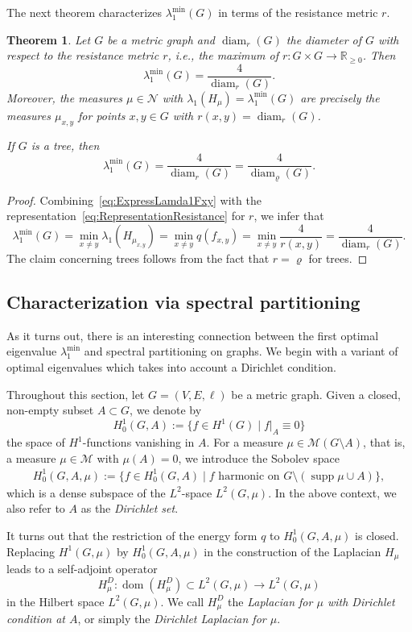 \documentclass[reqno]{amsart}
\theoremstyle{plain}
\newtheorem{thm}{Theorem}[section]
\theoremstyle{definition}
\theoremstyle{remark}
\numberwithin{equation}{section}
\newcommand{\R}{\mathbb{R}}     %
\newcommand{\cM}{\mathcal{M}}
\newcommand{\cN}{\mathcal{N}}
\newcommand{\supp}{\operatorname{supp}}
\newcommand{\dom}{\operatorname{dom}}
\newcommand{\diam}{\operatorname{diam}}
\begin{document}
The next theorem characterizes $\lambda_1^{\min}(G)$ in terms of the resistance metric $r$.
\begin{thm} \label{Lem: Resitance metric and optimal eigenvalue}
	Let $G$ be a metric graph and $\diam_r(G)$ the diameter of $G$ with respect to the resistance metric $r$, i.e., the maximum of $r\colon G \times G \to \R_{\geq 0}$. Then
	\[
	\lambda_1^{\min}(G) = \frac{4}{\diam_r(G)}.
	\]
	Moreover, the measures $\mu \in \cN$ with $\lambda_1(H_\mu) = \lambda_1^{\min}(G)$ are precisely the measures $\mu_{x,y}$ for points $x, y\in G$ with $r(x,y) = \diam_r(G)$.
	
	If $G$ is a tree, then
	\[
	\lambda_1^{\min}(G) = \frac{4}{\diam_r(G)} = \frac{4}{\diam_\varrho(G)}.
	\]
\end{thm}
\begin{proof}
	Combining~\eqref{eq:ExpressLamda1Fxy} with the representation~\eqref{eq:RepresentationResistance} for $r$, we infer that
	\[
	\lambda_1^{\min}(G)  = \min_{x \neq y} \lambda_1 (H_{\mu_{x,y}}) =\min_{x \neq y} q(f_{x,y}) =  \min_{x \neq y} \frac{4}{r(x,y)} = \frac{4}{\diam_r(G)}.
	\]
	The claim concerning trees follows from the fact that $r  = \varrho$ for trees.
\end{proof}


\subsection{Characterization via spectral partitioning}
As it turns out, there is an interesting connection between the first optimal eigenvalue $\lambda_1^{\min}$ and spectral partitioning on graphs.
We begin with a variant of optimal eigenvalues which takes into account a Dirichlet condition.

Throughout this section, let $G=(V,E, \ell)$ be a metric graph. Given a closed, non-empty subset $A \subset G$, we 
denote by
\[
H^1_0(G,A) := \{f \in H^1(G) \; | \; f|_{A} \equiv 0\}
\]
the space of $H^1$-functions vanishing in $A$. For a measure $\mu\in \cM(G \setminus A)$, that is, a measure $\mu \in \cM$ with $\mu(A) = 0$, we introduce the Sobolev space
\begin{align*}
H^1_0(G,A,\mu) := \{f \in H^1_0(G,A) \; | \; f \text{ harmonic on } G\setminus (\supp \mu \cup A)\}, 
\end{align*}
which is a dense subspace of the $L^2$-space $L^2(G, \mu)$. In the above context, we also refer to $A$ as the \emph{Dirichlet set}.


It turns out that the restriction of the energy form $q$ to $H^1_0(G,A,\mu)$ is closed. Replacing $H^1(G,\mu)$ by $H^1_0(G,A, \mu)$ in the construction of the Laplacian $H_\mu$ leads to a self-adjoint operator
\[
H_\mu^D \colon \dom(H_\mu^D) \subset L^2(G, \mu) \to L^2(G, \mu)
\]
in the Hilbert space $L^2(G, \mu)$. We call $H_\mu^D$ the \emph{Laplacian for $\mu$ with Dirichlet condition at $A$}, or simply the \emph{Dirichlet Laplacian for $\mu$}.
\end{document}
